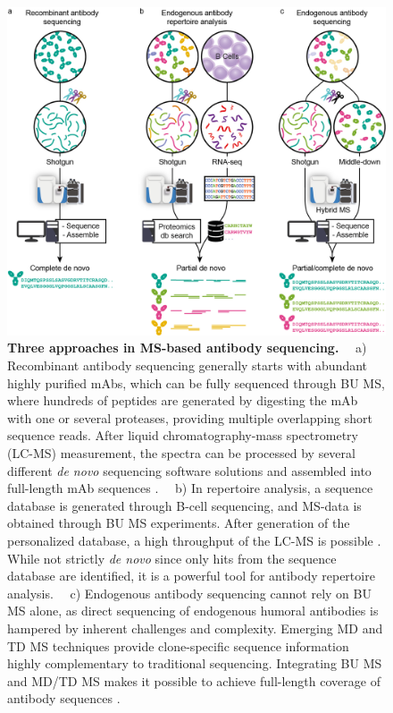 \begin{figure}[!htb]
  \center
  \includegraphics[]{Chapter.1/Figures/f2.png}
  \caption{
    \textbf{Three approaches in MS-based antibody sequencing.}
    ~~a) Recombinant antibody sequencing generally starts with abundant highly purified mAbs, which can be fully sequenced through BU MS, where hundreds of peptides are generated by digesting the mAb with one or several proteases, providing multiple overlapping short sequence reads. After liquid chromatography-mass spectrometry (LC-MS) measurement, the spectra can be processed by several different \emph{de novo} sequencing software solutions and assembled into full-length mAb sequences \cite{peng2021mass}. ~~b) In repertoire analysis, a sequence database is generated through B-cell sequencing, and MS-data is obtained through BU MS experiments. After generation of the personalized database, a high throughput of the LC-MS is possible \cite{georgiou2014promise}. While not strictly \emph{de novo} since only hits from the sequence database are identified, it is a powerful tool for antibody repertoire analysis. ~~c) Endogenous antibody sequencing cannot rely on BU MS alone, as direct sequencing of endogenous humoral antibodies is hampered by inherent challenges and complexity. Emerging MD and TD MS techniques provide clone-specific sequence information highly complementary to traditional sequencing. Integrating BU MS and MD/TD MS makes it possible to achieve full-length coverage of antibody sequences \cite{bondt2021human}.
  }
  \label{fig:fig1.2}
\end{figure}

